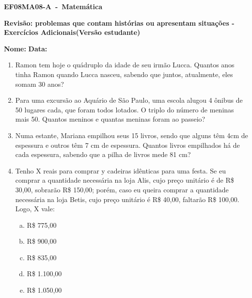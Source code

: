 \documentclass[a4paper,14pt]{article}
\begin{document}
	
	\noindent\textbf{EF08MA08-A~-~Matemática} 
	
	\begin{center}
		\textbf{Revisão: problemas que contam histórias ou apresentam situações - Exercícios Adicionais(Versão estudante)}
	\end{center}
	
	
	\noindent\textbf{Nome:} \underline{\hspace{10cm}}
    \noindent\textbf{Data:} \underline{\hspace{4cm}}
	
	
	\begin{multicols}{2}
	\begin{enumerate}
		\item Ramon tem hoje o quádruplo da idade de seu irmão Lucca. Quantos anos tinha Ramon quando Lucca nasceu, sabendo que juntos, atualmente, eles somam 30 anos?
		\vspace{18cm}
		\item Para uma excursão ao Aquário de São Paulo, uma escola alugou 4 ônibus de 50 lugares cada, que foram todos lotados. O triplo do número de meninas mais 50. Quantos meninos e quantas meninas foram ao passeio?
		\vspace{18cm}
		\item Numa estante, Mariana empilhou seus 15 livros, sendo que alguns têm 4cm de espessura e outros têm 7 cm de espessura. Quantos livros empilhados há de cada espessura, sabendo que a pilha de livros mede 81 cm? 
		\vspace{20cm}
		\item Tenho X reais para comprar y cadeiras idênticas para uma festa. Se eu comprar a quantidade necessária na loja Alis, cujo preço unitário é de R\$ 30,00, sobrarão R\$ 150,00; porém, caso eu queira comprar a quantidade necessária na loja Betis, cujo preço unitário é R\$ 40,00, faltarão R\$ 100,00. Logo, X vale:
		\begin{enumerate}[a)]
			\item R\$ 775,00
			\item R\$ 900,00
			\item R\$ 835,00
			\item R\$ 1.100,00
			\item R\$ 1.050,00
		\end{enumerate}

\end{enumerate}
\end{multicols}
\end{document}
